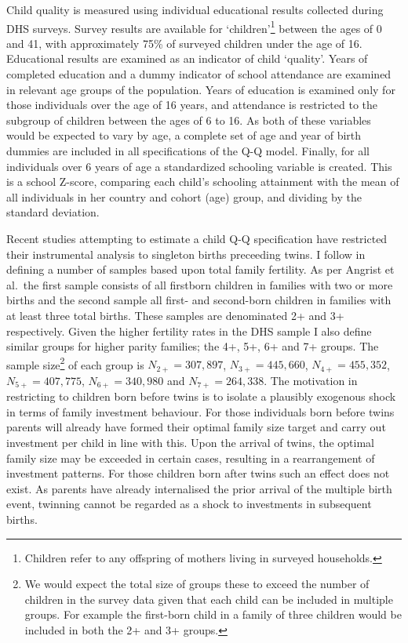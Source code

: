 \documentclass{article}[11pt,subeqn]
\begin{document}
\begin{spacing}{1.5}
Child quality is measured using individual educational results collected during DHS surveys.   Survey results are available for `children'\footnote{Children 
refer to any offspring of mothers living in surveyed households.} between the ages of 0 and 41, with approximately 75\% of surveyed children 
under the age of 16. Educational results are examined as an indicator of child `quality'.  Years of completed education and a dummy indicator of 
school attendance are examined in relevant age groups of the population.  Years of education is examined only for those individuals over the age 
of 16 years, and attendance is restricted to the subgroup of children between the ages of 6 to 16.  As both of these variables would be expected to 
vary by age, a complete set of age and year of birth dummies are included in all specifications of the Q-Q model.  Finally, for all individuals over 6 years 
of age a standardized schooling variable is created.  This is a school Z-score, comparing each child's schooling attainment with the mean of all individuals 
in her country and cohort (age) group, and dividing by the standard deviation.  

Recent studies attempting to estimate a child Q-Q specification have restricted their instrumental analysis to singleton births preceeding 
twins.  I follow \citet{Angristetal2010} in defining a number of samples based upon total family fertility.  As per Angrist et al.\ the first sample 
consists of all firstborn children in families with two or more births and the second sample all first- and second-born children in families with 
at least three total births.  These samples are denominated 2+ and 3+ respectively.  Given the higher fertility rates in the DHS sample I also 
define similar groups for higher parity families; the 4+, 5+, 6+ and 7+ groups.  The 
sample size\footnote{We would expect the total size of groups these to exceed the number of children in the survey data given that each child
can be included in multiple groups.  For example the first-born child in a family of three children would be included in both the 2+ and 3+ groups.} 
of each group is $N_{2+}= 307,897$, $N_{3+}=445,660$, $N_{4+}= 455,352$, $N_{5+}=407,775$, $N_{6+}=340,980$ and $N_{7+}=264,338$.  
The motivation in restricting to children born before twins is to isolate a plausibly exogenous shock in terms of family investment behaviour.  For those 
individuals born before twins parents will already have formed their optimal family size target and carry out investment per child in line 
with this.  Upon the arrival of twins, the optimal family size may be exceeded in certain cases, resulting in a rearrangement of investment 
patterns.  For those children born after twins such an effect does not exist.  As parents have already internalised the prior arrival of the 
multiple birth event, twinning cannot be regarded as a shock to investments in subsequent births.



\end{spacing}
\end{document}
